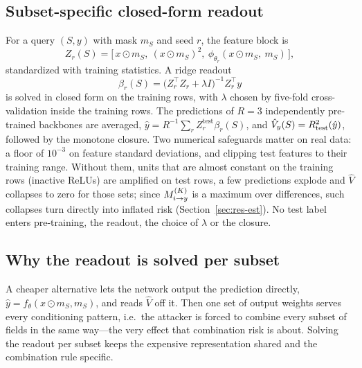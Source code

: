 \subsection{Subset-specific closed-form readout}
For a query $(S,y)$ with mask $m_S$ and seed $r$, the feature block is
\begin{equation}
Z_{r}(S) = \big[\, x\odot m_S,\ (x \odot m_S)^{2},\ \phi_{\theta_r}(x\odot m_S,\ m_S) \,\big],
\end{equation}
standardized with training statistics. A ridge readout
\begin{equation}\label{eq:ridge}
\beta_{r}(S) = \big(Z_r^{\top} Z_r + \lambda I\big)^{-1} Z_r^{\top} y
\end{equation}
is solved in closed form on the training rows, with $\lambda$ chosen by five-fold
cross-validation inside the training rows. The predictions of $R=3$ independently pre-trained
backbones are averaged, $\hat y = R^{-1}\sum_r Z_r^{\mathrm{test}}\beta_r(S)$, and
$\hat V_y(S)=R^{2}_{\mathrm{test}}(\hat y)$, followed by the monotone closure. Two numerical
safeguards matter on real data: a floor of $10^{-3}$ on feature standard deviations, and
clipping test features to their training range. Without them, units that are almost constant
on the training rows (inactive ReLUs) are amplified on test rows, a few predictions explode and
$\hat V$ collapses to zero for those sets; since $M^{(K)}_{i \to y}$ is a maximum over differences, such
collapses turn directly into inflated risk (Section~\ref{sec:res-est}). No test label enters
pre-training, the readout, the choice of $\lambda$ or the closure.

\subsection{Why the readout is solved per subset}
A cheaper alternative lets the network output the prediction directly, $\hat y=f_\theta(x\odot
m_S, m_S)$, and reads $\hat V$ off it. Then one set of output weights serves every
conditioning pattern, i.e.\ the attacker is forced to combine every subset of fields in the
same way---the very effect that combination risk is about. Solving the readout per subset
keeps the expensive representation shared and the combination rule specific.

